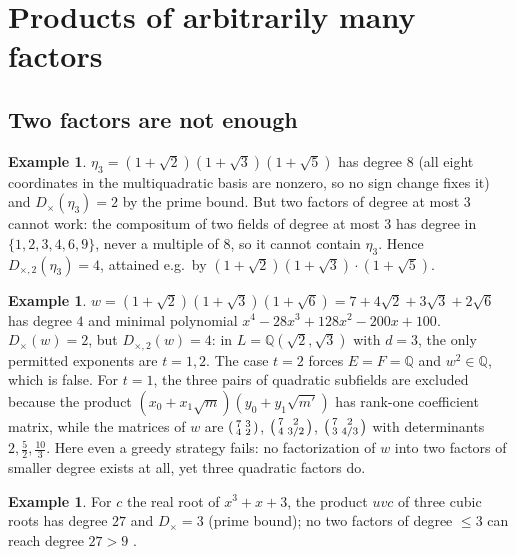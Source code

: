\documentclass[11pt,a4paper]{article}
\theoremstyle{definition}
\newtheorem{example}[theorem]{Example}
\theoremstyle{remark}
\newcommand{\Q}{\mathbb{Q}}
\newcommand{\Dt}{D_{\times}}
\newcommand{\Dtt}{D_{\times,2}}
\begin{document}
\section{Products of arbitrarily many factors}\label{sec:many}

\subsection{Two factors are not enough}

\begin{example}\label{ex:eta}
$\eta_3=(1+\sqrt2)(1+\sqrt3)(1+\sqrt5)$ has degree $8$ (all eight coordinates in the multiquadratic
basis are nonzero, so no sign change fixes it) and $\Dt(\eta_3)=2$ by the prime bound.  But two factors
of degree at most $3$ cannot work: the compositum of two fields of degree at most $3$ has degree in
$\{1,2,3,4,6,9\}$, never a multiple of $8$, so it cannot contain $\eta_3$.  Hence $\Dtt(\eta_3)=4$,
attained e.g.\ by $(1+\sqrt2)(1+\sqrt3)\cdot(1+\sqrt5)$.
\end{example}

\begin{example}\label{ex:w}
$w=(1+\sqrt2)(1+\sqrt3)(1+\sqrt6)=7+4\sqrt2+3\sqrt3+2\sqrt6$ has degree $4$ and minimal polynomial
$x^4-28x^3+128x^2-200x+100$.  $\Dt(w)=2$, but $\Dtt(w)=4$: in $L=\Q(\sqrt2,\sqrt3)$ with $d=3$,
the only permitted exponents are $t=1,2$.  The case $t=2$ forces $E=F=\Q$ and $w^2\in\Q$, which is
false.  For $t=1$, the three pairs of quadratic subfields are excluded because the
product $(x_0+x_1\sqrt m)(y_0+y_1\sqrt{m'})$ has rank-one coefficient matrix, while the matrices of
$w$ are
$\begin{psmallmatrix}7&3\\4&2\end{psmallmatrix}$,
$\begin{psmallmatrix}7&2\\4&3/2\end{psmallmatrix}$,
$\begin{psmallmatrix}7&2\\3&4/3\end{psmallmatrix}$
with determinants $2,\tfrac52,\tfrac{10}3$.  Here even a greedy strategy fails: no factorization of
$w$ into two factors of smaller degree exists at all, yet three quadratic factors do.
\end{example}

\begin{example}
For $c$ the real root of $x^3+x+3$, the product $uvc$ of three cubic roots has degree $27$ and
$\Dt=3$ (prime bound); no two factors of degree $\le3$ can reach degree $27>9$ \cite{r2}.
\end{example}
\end{document}
